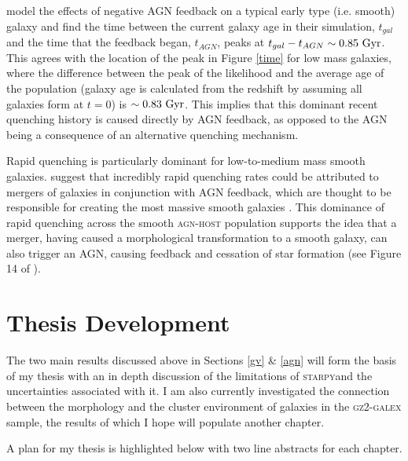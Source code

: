\documentclass[useAMS,usenatbib]{mn2e}
\def\starpy {\textsc{starpy}}
\begin{document}
\cite{Torbra09} model the effects of negative AGN feedback on a typical early type (i.e. smooth) galaxy and find the time between the current galaxy age in their simulation, $t_{gal}$ and the time that the feedback began, $t_{AGN}$, peaks at $t_{gal} - t_{AGN} \sim 0.85 ~\rm{Gyr}$. This agrees with the location of the peak in Figure \ref{time} for low mass galaxies, where the difference between the peak of the likelihood and the average age of the population (galaxy age is calculated from the redshift by assuming all galaxies form at $t=0$) is $\sim0.83 ~\rm{Gyr}$. This implies that this dominant recent quenching history is caused directly by AGN feedback, as opposed to the AGN being a consequence of an alternative quenching mechanism.

Rapid quenching is particularly dominant for low-to-medium mass smooth galaxies. \cite{Sme2015} suggest that incredibly rapid quenching rates could be attributed to mergers of galaxies in conjunction with AGN feedback, which are thought to be responsible for creating the most massive smooth galaxies \citep{Con03, Springel05, Hopkins08}. This dominance of rapid quenching across the smooth \textsc{agn-host} population supports the idea that a merger, having caused a morphological transformation to a smooth galaxy, can also trigger an AGN, causing feedback and cessation of star formation (see Figure 14 of \citealt{Sch2014}).


\section{Thesis Development}\label{plan}
The two main results discussed above in Sections \ref{gv} \& \ref{agn} will form the basis of my thesis with an in depth discussion of the limitations of \starpy and the uncertainties associated with it. I am also currently investigated the connection between the morphology and the cluster environment of galaxies in the \textsc{gz2-galex} sample, the results of which I hope will populate another chapter. 

A plan for my thesis is highlighted below with two line abstracts for each chapter. 
\end{document}
